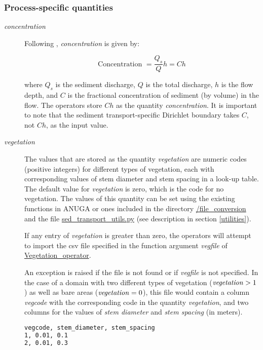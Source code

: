 \documentclass[10pt]{article}
\begin{document}
\subsubsection{Process-specific quantities}

\begin{description}
\item[\textit{concentration}] \hfill

Following \citet{Simpson:2006aa}, \textit{concentration} is given by:

\begin{equation}
\mbox{Concentration } = \frac{Q_s}{Q} h = C h
\end{equation}

\noindent where $Q_s$ is the sediment discharge, $Q$ is the total discharge, $h$ is the flow depth, and $C$ is the fractional concentration of sediment (by volume) in the flow. The operators store $C h$ as the quantity \textit{concentration}. It is important to note that the sediment transport-specific Dirichlet boundary takes $C$, not $C h$, as the input value.

\item[\textit{vegetation}] \hfill

The values that are stored as the quantity \textit{vegetation} are numeric codes (positive integers) for different types of vegetation, each with corresponding values of stem diameter and stem spacing in a look-up table. The default value for \textit{vegetation} is zero, which is the code for no vegetation. The values of this quantity can be set using the existing functions in ANUGA or ones included in the directory \url{/file_conversion} and the file \url{sed_transport_utils.py} (see description in section \ref{utilities}).

If any entry of \textit{vegetation} is greater than zero, the operators will attempt to import the csv file specified in the function argument \textit{vegfile} of \url{Vegetation_operator}.

An exception is raised if the file is not found or if \textit{vegfile} is not specified. In the case of a domain with two different types of vegetation ($\mbox{\textit{vegetation}}>1$) as well as bare areas ($\mbox{\textit{vegetation}}=0$), this file would contain a column \textit{vegcode} with the corresponding code in the quantity \textit{vegetation}, and two columns for the values of \textit{stem diameter} and \textit{stem spacing} (in meters).

\begin{lstlisting}[language=TeX, caption=Example of vegfile]
vegcode, stem_diameter, stem_spacing
1, 0.01, 0.1
2, 0.01, 0.3
\end{lstlisting} 


\end{description}
\end{document}
